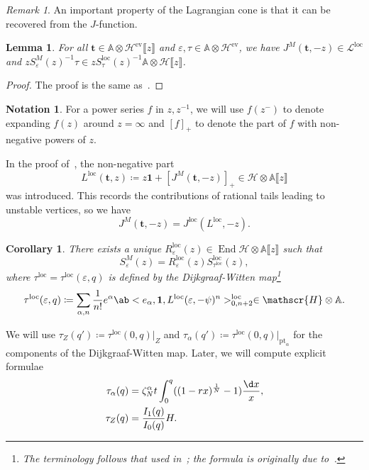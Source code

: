 \documentclass[10pt]{amsart}
\newtheorem{cor}[thm]{Corollary}
\newtheorem{lem}[thm]{Lemma}
\theoremstyle{definition}
\newtheorem{notn}[thm]{Notation}
\theoremstyle{remark}
\newtheorem{rmk}[thm]{Remark}
\theoremstyle{plain}
\theoremstyle{definition}
\theoremstyle{remark}
\newcommand{\A}{\mathbb{A}}
\newcommand{\ep}{\varepsilon}
\newcommand{\msc}[1]{\mathscr{#1}}
\newcommand{\mbf}[1]{\mathbf{#1}}
\newcommand{\mr}[1]{\mathrm{#1}}
\newcommand{\1}{\mathbf{1}}
\newcommand{\2}{\mathbf{2}}
\newcommand{\3}{\mathbf{3}}
\newcommand{\pt}{\mr{pt}}
\newcommand{\loc}{\mr{loc}}
\newcommand{\ps}[1]{\llbracket #1 \rrbracket}
\DeclareMathOperator{\End}{End}
\DeclareMathOperator{\ev}{ev}
\numberwithin{equation}{section}
\begin{document}
\begin{rmk}
    An important property of the Lagrangian cone is that it can be recovered from the $J$-function.
\end{rmk}

\begin{lem}\label{lem:msponlocallagcone}
    For all $\mbf{t} \in \A \otimes \msc{H}^{\ev}\ps{z}$ and $\ep, \tau \in \A \otimes \msc{H}^{\ev}$, we have $J^M(\mbf{t}, -z) \in \msc{L}^{\loc}$ and $z S_{\ep}^M(z)^{-1} \tau \in z S_{\tau}^{\loc}(z)^{-1} \A \otimes \msc{H}\ps{z}$.
\end{lem}

\begin{proof}
    The proof is the same as~\cite[Lemma 1.8]{nmsp2}.
\end{proof}

\begin{notn}
    For a power series $f$ in $z, z^{-1}$, we will use $f(z^-)$ to denote expanding $f(z)$ around $z = \infty$ and $[f]_+$ to denote the part of $f$ with non-negative powers of $z$.
\end{notn}

In the proof of~\cite[Lemma 1.8]{nmsp2}, the non-negative part
\[ L^{\loc}(\mbf{t}, z) \coloneqq z \1 + [J^M(\mbf{t}, -z)]_+ \in \msc{H} \otimes \A\ps{z} \]
was introduced. This records the contributions of rational tails leading to unstable vertices, so we have
\[ J^M(\mbf{t}, -z) = J^{\loc}(L^{\loc}, -z). \]

\begin{cor}
    There exists a unique $R_{\ep}^{\loc}(z) \in \End \msc{H} \otimes \A\ps{z}$ such that
    \begin{equation}\label{eqn:rloc}
    S_{\ep}^M(z) = R_{\ep}^{\loc}(z) S_{\tau^{\loc}}^{\loc}(z), 
    \end{equation}
    where $\tau^{\loc} = \tau^{\loc}(\ep, q)$ is defined by the Dijkgraaf-Witten map\footnote{The terminology follows that used in~\cite{virasorotoricbundle,nmsp2}; the formula is originally due to~\cite{dijkgraafwitten}.}
    \[ \tau^{\loc}(\ep, q) \coloneqq \sum_{\alpha, n} \frac{1}{n!} e^{\alpha} \ab<e_{\alpha}, \mbf{1}, L^{\loc}(\ep, -\psi)^n>_{0,n+2}^{\loc} \in \msc{H} \otimes \A. \]
\end{cor}

We will use $\tau_{Z}(q') \coloneqq \tau^{\loc}(0,q)|_{Z}$ and $\tau_{\alpha}(q') \coloneqq \tau^{\loc}(0,q)|_{\pt_{\alpha}}$ for the components of the Dijkgraaf-Witten map. Later, we will compute explicit formulae
\begin{align*}
    \tau_{\alpha}(q) &= \zeta_N^{\alpha}t \int_{0}^q ( (1-rx)^{\frac{1}{N}}-1 ) \frac{\d x}{x}, \\
    \tau_{Z}(q) &= \frac{I_1(q)}{I_0(q)}H.
\end{align*}
\end{document}
